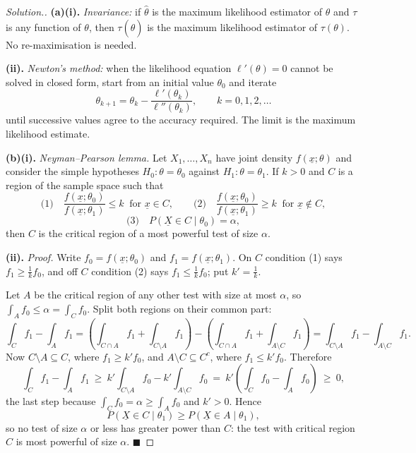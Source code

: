 \documentclass[12pt,a4paper]{report}
\theoremstyle{definition}
\theoremstyle{plain}
\newenvironment{solution}
  {\renewcommand{\qedsymbol}{}\begin{proof}[\textit{Solution}.]}
  {\end{proof}}
\begin{document}
\begin{solution}
\textbf{(a)(i).} \emph{Invariance:} if $\hat\theta$ is the maximum likelihood
estimator of $\theta$ and $\tau$ is any function of $\theta$, then
$\tau\left(\hat\theta\right)$ is the maximum likelihood estimator of
$\tau(\theta)$. No re-maximisation is needed.

\textbf{(ii).} \emph{Newton's method:} when the likelihood equation
$\ell'(\theta)=0$ cannot be solved in closed form, start from an initial value
$\theta_0$ and iterate
\[\theta_{k+1}=\theta_k-\frac{\ell'(\theta_k)}{\ell''(\theta_k)},
\qquad k=0,1,2,\ldots\]
until successive values agree to the accuracy required. The limit is the maximum
likelihood estimate.

\textbf{(b)(i).} \emph{Neyman--Pearson lemma.} Let $X_1,\ldots,X_n$ have joint
density $f(\underline{x};\theta)$ and consider the simple hypotheses
$H_0:\theta=\theta_0$ against $H_1:\theta=\theta_1$. If $k>0$ and $C$ is a region
of the sample space such that
\[\text{(1)}\quad\frac{f\left(\underline{x};\theta_0\right)}
{f\left(\underline{x};\theta_1\right)}\leq k\ \text{ for }\underline{x}\in C,
\qquad
\text{(2)}\quad\frac{f\left(\underline{x};\theta_0\right)}
{f\left(\underline{x};\theta_1\right)}\geq k\ \text{ for }\underline{x}\notin C,\]
\[\text{(3)}\quad P\left(\underline{X}\in C\mid\theta_0\right)=\alpha,\]
then $C$ is the critical region of a most powerful test of size $\alpha$.

\textbf{(ii).} \emph{Proof.} Write $f_0=f(\underline{x};\theta_0)$ and
$f_1=f(\underline{x};\theta_1)$. On $C$ condition (1) says $f_1\geq
\frac{1}{k}f_0$, and off $C$ condition (2) says $f_1\leq\frac{1}{k}f_0$; put
$k'=\frac{1}{k}$.

Let $A$ be the critical region of any other test with size at most $\alpha$, so
$\int_Af_0\leq\alpha=\int_Cf_0$. Split both regions on their common part:
\[\int_Cf_1-\int_Af_1
=\left(\int_{C\cap A}f_1+\int_{C\setminus A}f_1\right)
-\left(\int_{C\cap A}f_1+\int_{A\setminus C}f_1\right)
=\int_{C\setminus A}f_1-\int_{A\setminus C}f_1.\]
Now $C\setminus A\subseteq C$, where $f_1\geq k'f_0$, and
$A\setminus C\subseteq C^c$, where $f_1\leq k'f_0$. Therefore
\[\int_Cf_1-\int_Af_1
\ \geq\ k'\int_{C\setminus A}f_0-k'\int_{A\setminus C}f_0
\ =\ k'\left(\int_Cf_0-\int_Af_0\right)\ \geq\ 0,\]
the last step because $\int_Cf_0=\alpha\geq\int_Af_0$ and $k'>0$. Hence
\[P\left(\underline{X}\in C\mid\theta_1\right)\geq
P\left(\underline{X}\in A\mid\theta_1\right),\]
so no test of size $\alpha$ or less has greater power than $C$: the test with
critical region $C$ is most powerful of size $\alpha$. $\blacksquare$


\end{solution}
\end{document}
